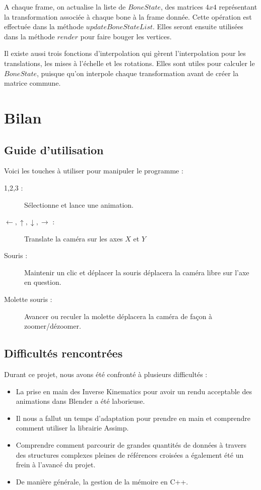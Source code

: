 \documentclass[a4paper]{report}
\begin{document}
A chaque frame, on actualise la liste de $BoneState$, des matrices $4x4$ représentant la transformation associée à chaque bone à la frame donnée. Cette opération est effectuée dans la méthode $updateBoneStateList$. Elles seront ensuite utilisées dans la méthode $render$ pour faire bouger les vertices.

Il existe aussi trois fonctions d'interpolation qui gèrent l'interpolation pour les translations, les mises à l'échelle et les rotations. Elles sont utiles pour calculer le $BoneState$, puisque qu'on interpole chaque transformation avant de créer la matrice commune.





\newpage
\chapter{Bilan}
\section{Guide d'utilisation}
Voici les touches à utiliser pour manipuler le programme :
\begin{description}
	\item[1,2,3 :] Sélectionne et lance une animation.
	\item[$\leftarrow,\uparrow,\downarrow,\rightarrow$ :] Translate la caméra sur les axes $X$ et $Y$
	\item[Souris :] Maintenir un clic et déplacer la souris déplacera la caméra libre sur l'axe en question.
	\item[Molette souris :] Avancer ou reculer la molette déplacera la caméra de façon à zoomer/dézoomer.
\end{description}
\section{Difficultés rencontrées}
\par
Durant ce projet, nous avons été confronté à plusieurs difficultés :
\begin{itemize}
\item La prise en main des Inverse Kinematics pour avoir un rendu acceptable des animations dans Blender a été laborieuse.
\item Il nous a fallut un temps d'adaptation pour prendre en main et comprendre comment utiliser la librairie Assimp.
\item Comprendre comment parcourir de grandes quantités de données à travers des structures complexes pleines de références croisées a également été un frein à l'avancé du projet.
\item De manière générale, la gestion de la mémoire en C++.
\end{itemize}
\end{document}
